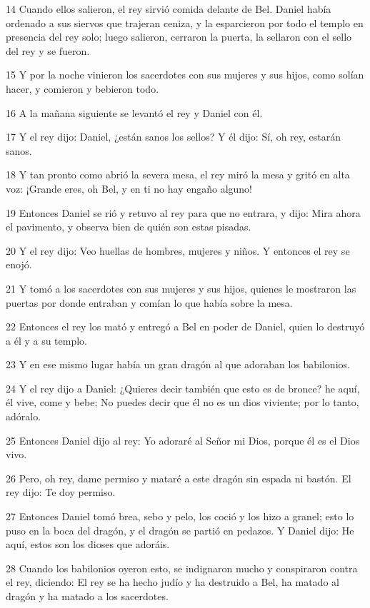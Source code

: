 \par 14 Cuando ellos salieron, el rey sirvió comida delante de Bel. Daniel había ordenado a sus siervos que trajeran ceniza, y la esparcieron por todo el templo en presencia del rey solo; luego salieron, cerraron la puerta, la sellaron con el sello del rey y se fueron.
\par 15 Y por la noche vinieron los sacerdotes con sus mujeres y sus hijos, como solían hacer, y comieron y bebieron todo.
\par 16 A la mañana siguiente se levantó el rey y Daniel con él.
\par 17 Y el rey dijo: Daniel, ¿están sanos los sellos? Y él dijo: Sí, oh rey, estarán sanos.
\par 18 Y tan pronto como abrió la severa mesa, el rey miró la mesa y gritó en alta voz: ¡Grande eres, oh Bel, y en ti no hay engaño alguno!
\par 19 Entonces Daniel se rió y retuvo al rey para que no entrara, y dijo: Mira ahora el pavimento, y observa bien de quién son estas pisadas.
\par 20 Y el rey dijo: Veo huellas de hombres, mujeres y niños. Y entonces el rey se enojó.
\par 21 Y tomó a los sacerdotes con sus mujeres y sus hijos, quienes le mostraron las puertas por donde entraban y comían lo que había sobre la mesa.
\par 22 Entonces el rey los mató y entregó a Bel en poder de Daniel, quien lo destruyó a él y a su templo.
\par 23 Y en ese mismo lugar había un gran dragón al que adoraban los babilonios.
\par 24 Y el rey dijo a Daniel: ¿Quieres decir también que esto es de bronce? he aquí, él vive, come y bebe; No puedes decir que él no es un dios viviente; por lo tanto, adóralo.
\par 25 Entonces Daniel dijo al rey: Yo adoraré al Señor mi Dios, porque él es el Dios vivo.
\par 26 Pero, oh rey, dame permiso y mataré a este dragón sin espada ni bastón. El rey dijo: Te doy permiso.
\par 27 Entonces Daniel tomó brea, sebo y pelo, los coció y los hizo a granel; esto lo puso en la boca del dragón, y el dragón se partió en pedazos. Y Daniel dijo: He aquí, estos son los dioses que adoráis.
\par 28 Cuando los babilonios oyeron esto, se indignaron mucho y conspiraron contra el rey, diciendo: El rey se ha hecho judío y ha destruido a Bel, ha matado al dragón y ha matado a los sacerdotes.
